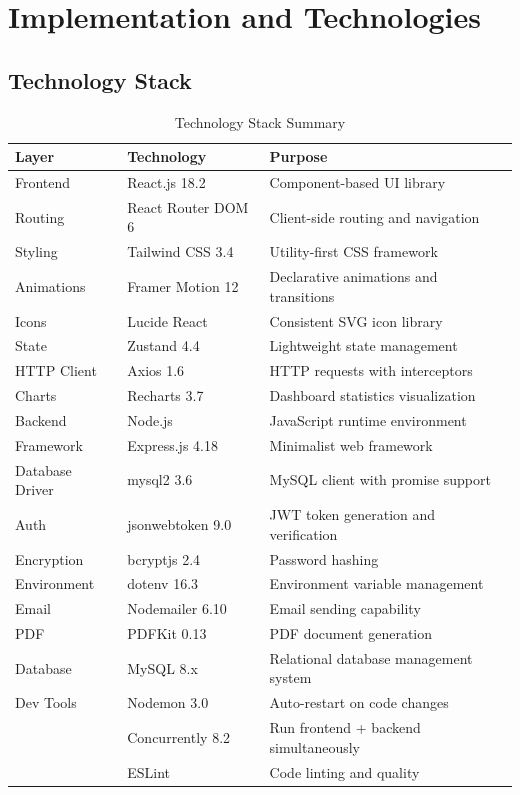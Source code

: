 \documentclass[12pt,a4paper]{report}
\begin{document}
\chapter{Implementation and Technologies}

\section{Technology Stack}
\begin{table}[H]
\centering
\caption{Technology Stack Summary}
\label{tab:techstack}
\begin{tabularx}{\textwidth}{|l|l|X|}
\hline
\textbf{Layer} & \textbf{Technology} & \textbf{Purpose} \\
\hline
Frontend & React.js 18.2 & Component-based UI library \\
Routing & React Router DOM 6 & Client-side routing and navigation \\
Styling & Tailwind CSS 3.4 & Utility-first CSS framework \\
Animations & Framer Motion 12 & Declarative animations and transitions \\
Icons & Lucide React & Consistent SVG icon library \\
State & Zustand 4.4 & Lightweight state management \\
HTTP Client & Axios 1.6 & HTTP requests with interceptors \\
Charts & Recharts 3.7 & Dashboard statistics visualization \\
\hline
Backend & Node.js & JavaScript runtime environment \\
Framework & Express.js 4.18 & Minimalist web framework \\
Database Driver & mysql2 3.6 & MySQL client with promise support \\
Auth & jsonwebtoken 9.0 & JWT token generation and verification \\
Encryption & bcryptjs 2.4 & Password hashing \\
Environment & dotenv 16.3 & Environment variable management \\
Email & Nodemailer 6.10 & Email sending capability \\
PDF & PDFKit 0.13 & PDF document generation \\
\hline
Database & MySQL 8.x & Relational database management system \\
\hline
Dev Tools & Nodemon 3.0 & Auto-restart on code changes \\
 & Concurrently 8.2 & Run frontend + backend simultaneously \\
 & ESLint & Code linting and quality \\
\hline
\end{tabularx}
\end{table}
\end{document}
